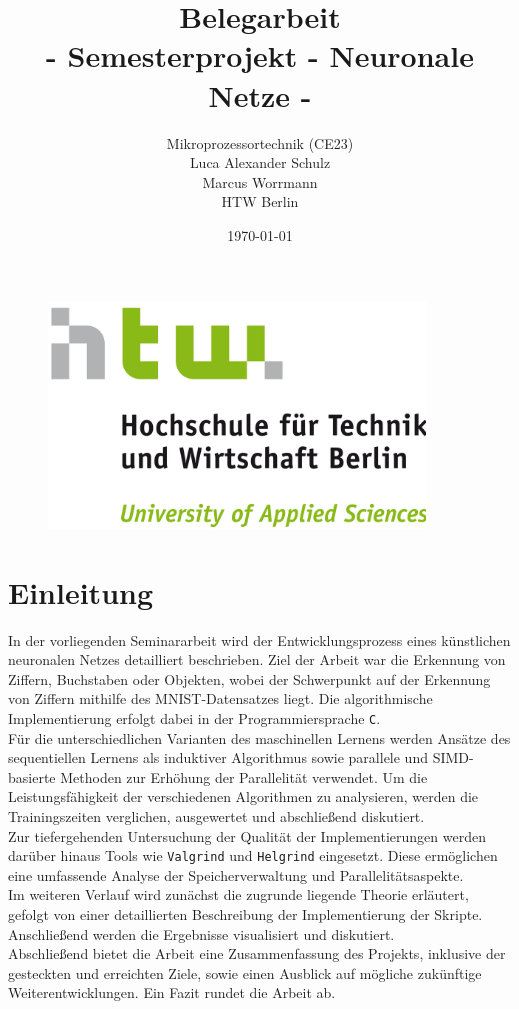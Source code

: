\documentclass[a4paper, 12pt]{article}
\title{Belegarbeit \\
		- Semesterprojekt - Neuronale Netze -}
\author{Mikroprozessortechnik (CE23) \\
Luca Alexander Schulz\\
Marcus Worrmann\\
HTW Berlin
}
\date{\today}
\begin{document}
	
\maketitle	

\begin{figure}[h]
	\centering
	\includegraphics[width=10cm]{Bilders/htw.png}
\end{figure}

\newpage 
\tableofcontents

\newpage %

\listoffigures
\listoftables

\newpage %

\section{Einleitung}\label{chapter..1}
In der vorliegenden Seminararbeit wird der Entwicklungsprozess eines künstlichen neuronalen Netzes 
detailliert beschrieben. Ziel der Arbeit war die Erkennung von Ziffern, Buchstaben oder Objekten, wobei 
der Schwerpunkt auf der Erkennung von Ziffern mithilfe des MNIST-Datensatzes \cite{MNIST-Datensatz} liegt. 
Die algorithmische Implementierung erfolgt dabei in der Programmiersprache \texttt{C}.\\
Für die unterschiedlichen Varianten des maschinellen Lernens werden Ansätze des sequentiellen 
Lernens als induktiver Algorithmus sowie parallele und SIMD-basierte Methoden zur Erhöhung der 
Parallelität verwendet. Um die Leistungsfähigkeit der verschiedenen Algorithmen zu analysieren, 
werden die Trainingszeiten verglichen, ausgewertet und abschließend diskutiert.\\
Zur tiefergehenden Untersuchung der Qualität der Implementierungen werden darüber hinaus Tools 
wie \texttt{Valgrind} und \texttt{Helgrind} eingesetzt. Diese ermöglichen eine umfassende Analyse 
der Speicherverwaltung und Parallelitätsaspekte.\\
Im weiteren Verlauf wird zunächst die zugrunde liegende Theorie erläutert, gefolgt von einer 
detaillierten Beschreibung der Implementierung der Skripte. Anschließend werden die Ergebnisse 
visualisiert und diskutiert.\\
Abschließend bietet die Arbeit eine Zusammenfassung des Projekts, inklusive der gesteckten und 
erreichten Ziele, sowie einen Ausblick auf mögliche zukünftige Weiterentwicklungen. Ein Fazit 
rundet die Arbeit ab.
\end{document}
